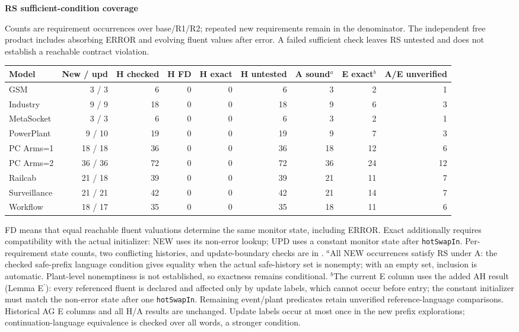 \noindent\textbf{RS sufficient-condition coverage}\par
Counts are requirement occurrences over base/R1/R2; repeated new requirements remain in the denominator. The independent free product includes absorbing ERROR and evolving fluent values after error. A failed sufficient check leaves RS untested and does not establish a reachable contract violation.
\begin{center}\scriptsize\begin{tabular}{@{}lrrrrrrrr@{}}\toprule
Model & New / upd & H checked & H FD & H exact & H untested & A sound$^a$ & E exact$^b$ & A/E unverified\\\midrule
GSM & 3 / 3 & 6 & 0 & 0 & 6 & 3 & 2 & 1\\
Industry & 9 / 9 & 18 & 0 & 0 & 18 & 9 & 6 & 3\\
MetaSocket & 3 / 3 & 6 & 0 & 0 & 6 & 3 & 2 & 1\\
PowerPlant & 9 / 10 & 19 & 0 & 0 & 19 & 9 & 7 & 3\\
PC Arms=1 & 18 / 18 & 36 & 0 & 0 & 36 & 18 & 12 & 6\\
PC Arms=2 & 36 / 36 & 72 & 0 & 0 & 72 & 36 & 24 & 12\\
Railcab & 21 / 18 & 39 & 0 & 0 & 39 & 21 & 11 & 7\\
Surveillance & 21 / 21 & 42 & 0 & 0 & 42 & 21 & 14 & 7\\
Workflow & 18 / 17 & 35 & 0 & 0 & 35 & 18 & 11 & 6\\
\bottomrule\end{tabular}\end{center}
FD means that equal reachable fluent valuations determine the same monitor state, including ERROR. Exact additionally requires compatibility with the actual initializer: NEW uses its non-error lookup; UPD uses a constant monitor state after \texttt{hotSwapIn}. Per-requirement state counts, two conflicting histories, and update-boundary checks are in .
$^a$All \RSAInclusionNew{} NEW occurrences satisfy RS under A: the checked safe-prefix language condition gives equality when the actual safe-history set is nonempty; with an empty set, inclusion is automatic. Plant-level nonemptiness is not established, so exactness remains conditional. $^b$The current E column uses the added AH result (Lemma E$^{\prime}$): every referenced fluent is declared and affected only by update labels, which cannot occur before entry; the constant initializer must match the non-error state after one \texttt{hotSwapIn}. Remaining event/plant predicates retain unverified reference-language comparisons. Historical AG E columns and all H/A results are unchanged. Update labels occur at most once in the new prefix explorations; continuation-language equivalence is checked over all words, a stronger condition.
